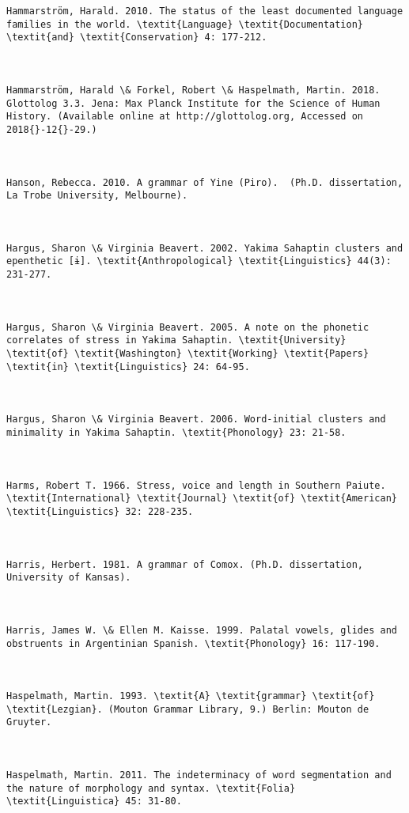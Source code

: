 \begin{verbatim}
Hammarström, Harald. 2010. The status of the least documented language families in the world. \textit{Language} \textit{Documentation} \textit{and} \textit{Conservation} 4: 177-212.



Hammarström, Harald \& Forkel, Robert \& Haspelmath, Martin. 2018. Glottolog 3.3. Jena: Max Planck Institute for the Science of Human History. (Available online at http://glottolog.org, Accessed on 2018{}-12{}-29.)



Hanson, Rebecca. 2010. A grammar of Yine (Piro).  (Ph.D. dissertation, La Trobe University, Melbourne).



Hargus, Sharon \& Virginia Beavert. 2002. Yakima Sahaptin clusters and epenthetic [ɨ]. \textit{Anthropological} \textit{Linguistics} 44(3): 231-277.



Hargus, Sharon \& Virginia Beavert. 2005. A note on the phonetic correlates of stress in Yakima Sahaptin. \textit{University} \textit{of} \textit{Washington} \textit{Working} \textit{Papers} \textit{in} \textit{Linguistics} 24: 64-95.



Hargus, Sharon \& Virginia Beavert. 2006. Word-initial clusters and minimality in Yakima Sahaptin. \textit{Phonology} 23: 21-58.



Harms, Robert T. 1966. Stress, voice and length in Southern Paiute. \textit{International} \textit{Journal} \textit{of} \textit{American} \textit{Linguistics} 32: 228-235.



Harris, Herbert. 1981. A grammar of Comox. (Ph.D. dissertation, University of Kansas).



Harris, James W. \& Ellen M. Kaisse. 1999. Palatal vowels, glides and obstruents in Argentinian Spanish. \textit{Phonology} 16: 117-190.



Haspelmath, Martin. 1993. \textit{A} \textit{grammar} \textit{of} \textit{Lezgian}. (Mouton Grammar Library, 9.) Berlin: Mouton de Gruyter.



Haspelmath, Martin. 2011. The indeterminacy of word segmentation and the nature of morphology and syntax. \textit{Folia} \textit{Linguistica} 45: 31-80.




\end{verbatim}
